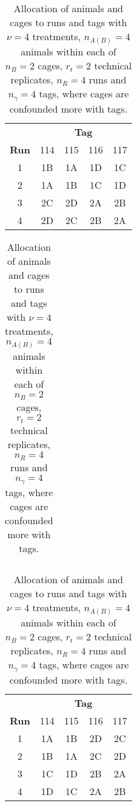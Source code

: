 \begin{table}[ht]                                       
\centering           
\itshape                            
\caption{The final allocation of animals and cages to runs and tags with $\nu = 4$ treatments, $n_{A(B)} = 4$ animals within each of $n_B = 2$ cages, $r_t = 2$ technical replicates, $n_R = 4$ runs and $n_\gamma = 4$ tags, where cages are more confounded with runs.}           
\begin{tabular}[t]{c|cccc}                                 
& \multicolumn{4}{c}{{\bf Tag}} \\                     
{\bf Run}  & \textnormal{114} & \textnormal{115} & \textnormal{116} & \textnormal{117} \\ 
\hline                                                  
\textnormal{1}  & 1B & 1A & 1D & 1C \\  
\textnormal{2}  & 1A & 1B & 1C & 1D \\  
\textnormal{3}  & 2C & 2D & 2A & 2B \\  
\textnormal{4}  & 2D & 2C & 2B & 2A \\          
\end{tabular}                                           
\label{tab:cagAniDes13}                                  

\begin{tabular}{l}
\\	
\end{tabular} 

\caption{Allocation of animals and cages to runs and tags with $\nu = 4$ treatments, $n_{A(B)} = 4$ animals within each of $n_B = 2$ cages, $r_t = 2$ technical replicates, $n_R = 4$ runs and $n_\gamma = 4$ tags, where cages are confounded more with tags.}           
\begin{tabular}[t]{c|cccc}                                 
& \multicolumn{4}{c}{{\bf Tag}} \\                     
{\bf Run}  & \textnormal{114} & \textnormal{115} & \textnormal{116} & \textnormal{117} \\ 
\hline                                                   
\textnormal{1}  & 1A & 1B & 2D & 2C \\
\textnormal{2}  & 1B & 1A & 2C & 2D \\
\textnormal{3}  & 1C & 1D & 2B & 2A \\
\textnormal{4}  & 1D & 1C & 2A & 2B \\        
\end{tabular}                                           
\label{tab:cagAniDes14}                                  
\end{table} 

